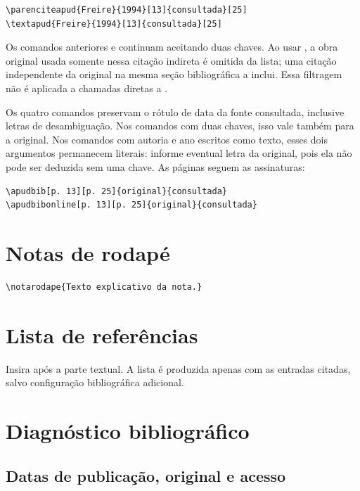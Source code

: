 \begin{lstlisting}
\parenciteapud{Freire}{1994}[13]{consultada}[25]
\textapud{Freire}{1994}[13]{consultada}[25]
\end{lstlisting}

Os comandos anteriores \texttt{\string\apudbib} e \texttt{\string\apudbibonline}
continuam aceitando duas chaves. Ao usar \texttt{\string\printundfreferences},
a obra original usada somente nessa citação indireta é omitida da lista; uma
citação independente da original na mesma seção bibliográfica a inclui. Essa
filtragem não é aplicada a chamadas diretas a \texttt{\string\printbibliography}.

Os quatro comandos preservam o rótulo de data da fonte consultada, inclusive
letras de desambiguação. Nos comandos com duas chaves, isso vale também para
a original. Nos comandos com autoria e ano escritos como texto, esses dois
argumentos permanecem literais: informe eventual letra da original, pois ela
não pode ser deduzida sem uma chave. As páginas seguem as assinaturas:

\begin{lstlisting}
\apudbib[p. 13][p. 25]{original}{consultada}
\apudbibonline[p. 13][p. 25]{original}{consultada}
\end{lstlisting}

\section{Notas de rodapé}

\begin{lstlisting}
\notarodape{Texto explicativo da nota.}
\end{lstlisting}

\section{Lista de referências}

Insira \texttt{\string\printundfreferences} após a parte textual. A lista é produzida apenas com as entradas citadas, salvo configuração bibliográfica adicional.

\section{Diagnóstico bibliográfico}

\subsection*{Datas de publicação, original e acesso}

